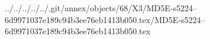 ../../../../../.git/annex/objects/68/X3/MD5E-s5224--6d9971037e189c94b3ee76eb1413b050.tex/MD5E-s5224--6d9971037e189c94b3ee76eb1413b050.tex